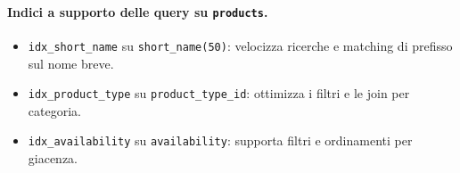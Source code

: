 \paragraph{Indici a supporto delle query su \texttt{products}.}
\begin{itemize}[leftmargin=2.2em]
  \item \texttt{idx\_short\_name} su \texttt{short\_name(50)}: velocizza ricerche e matching di prefisso sul nome breve.
  \item \texttt{idx\_product\_type} su \texttt{product\_type\_id}: ottimizza i filtri e le join per categoria.
  \item \texttt{idx\_availability} su \texttt{availability}: supporta filtri e ordinamenti per giacenza.
\end{itemize}

